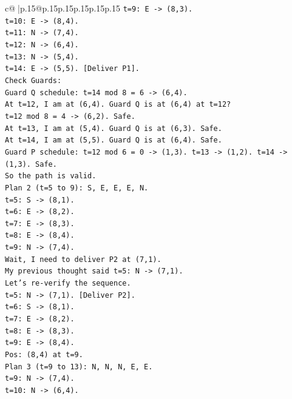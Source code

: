 \documentclass{article}
\begin{document}
{\begin{supertabular}{c@{$\;$}|p{.15\linewidth}@{}p{.15\linewidth}p{.15\linewidth}p{.15\linewidth}p{.15\linewidth}p{.15\linewidth}}
{{{\texttt{t=9: E {-}> (8,3).} \\
\texttt{t=10: E {-}> (8,4).} \\
\texttt{t=11: N {-}> (7,4).} \\
\texttt{t=12: N {-}> (6,4).} \\
\texttt{t=13: N {-}> (5,4).} \\
\texttt{t=14: E {-}> (5,5). {[}Deliver P1{]}.} \\
\texttt{Check Guards:} \\
\texttt{Guard Q schedule: t=14 mod 8 = 6 {-}> (6,4).} \\
\texttt{At t=12, I am at (6,4). Guard Q is at (6,4) at t=12?} \\
\texttt{t=12 mod 8 = 4 {-}> (6,2). Safe.} \\
\texttt{At t=13, I am at (5,4). Guard Q is at (6,3). Safe.} \\
\texttt{At t=14, I am at (5,5). Guard Q is at (6,4). Safe.} \\
\texttt{Guard P schedule: t=12 mod 6 = 0 {-}> (1,3). t=13 {-}> (1,2). t=14 {-}> (1,3). Safe.} \\
\texttt{So the path is valid.} \\
\texttt{Plan 2 (t=5 to 9): S, E, E, E, N.} \\
\texttt{t=5: S {-}> (8,1).} \\
\texttt{t=6: E {-}> (8,2).} \\
\texttt{t=7: E {-}> (8,3).} \\
\texttt{t=8: E {-}> (8,4).} \\
\texttt{t=9: N {-}> (7,4).} \\
\texttt{Wait, I need to deliver P2 at (7,1).} \\
\texttt{My previous thought said t=5: N {-}> (7,1).} \\
\texttt{Let's re{-}verify the sequence.} \\
\texttt{t=5: N {-}> (7,1). {[}Deliver P2{]}.} \\
\texttt{t=6: S {-}> (8,1).} \\
\texttt{t=7: E {-}> (8,2).} \\
\texttt{t=8: E {-}> (8,3).} \\
\texttt{t=9: E {-}> (8,4).} \\
\texttt{Pos: (8,4) at t=9.} \\
\texttt{Plan 3 (t=9 to 13): N, N, N, E, E.} \\
\texttt{t=9: N {-}> (7,4).} \\
\texttt{t=10: N {-}> (6,4).} \\
}}}
\end{supertabular}}
\end{document}

